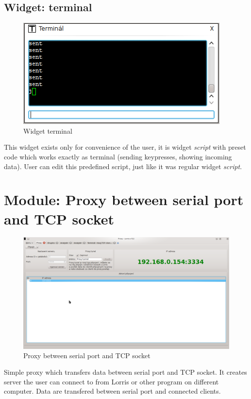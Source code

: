 \documentclass[12pt, a4paper, oneside]{article}
\newcommand{\It}{\textit}  %
\begin{document}
\subsection{Widget: terminal}
\begin{figure}[H]
\begin{center}
\includegraphics[scale=0.70]{img/w_terminal.png}
\caption{Widget terminal}
\end{center}
\end{figure}
This widget exists only for convenience of the user, it is widget \It{script} with preset code which works exactly as terminal (sending keypresses, showing incoming data). User can edit this predefined script, just like it was regular widget \It{script}.

\newpage
\setlength{\voffset}{0mm} %
\pagestyle{plain}
\section{Module: Proxy between serial port and TCP socket}
\begin{figure}[H]
\begin{center}
\includegraphics[width=\textwidth]{img/proxy.png}
\caption{Proxy between serial port and TCP socket}
\label{Shupito}
\end{center}
\end{figure}
Simple proxy which transfers data between serial port and TCP socket. It creates server the user can connect to from Lorris or other program on different computer. Data are transfered between serial port and connected clients.
\end{document}

